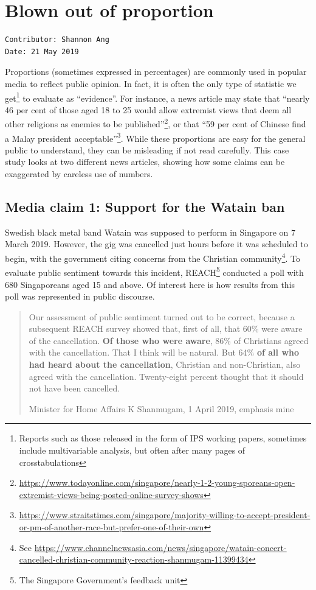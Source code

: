 \documentclass[openany]{book}
\let\rmarkdownfootnote\footnote%
\def\footnote{\protect\rmarkdownfootnote}
\begin{document}
\chapter{Blown out of proportion}\label{oop}

\begin{verbatim}
Contributor: Shannon Ang
Date: 21 May 2019
\end{verbatim}

Proportions (sometimes expressed in percentages) are commonly used in
popular media to reflect public opinion. In fact, it is often the only
type of statistic we get\footnote{Reports such as those released in the
  form of IPS working papers, sometimes include multivariable analysis,
  but often after many pages of crosstabulations} to evaluate as
``evidence''. For instance, a news article may state that ``nearly 46
per cent of those aged 18 to 25 would allow extremist views that deem
all other religions as enemies to be published''\footnote{\url{https://www.todayonline.com/singapore/nearly-1-2-young-sporeans-open-extremist-views-being-posted-online-survey-shows}},
or that ``59 per cent of Chinese find a Malay president
acceptable''\footnote{\url{https://www.straitstimes.com/singapore/majority-willing-to-accept-president-or-pm-of-another-race-but-prefer-one-of-their-own}}.
While these proportions are easy for the general public to understand,
they can be misleading if not read carefully. This case study looks at
two different news articles, showing how some claims can be exaggerated
by careless use of numbers.

\section{Media claim 1: Support for the Watain ban}\label{watain}

Swedish black metal band Watain was supposed to perform in Singapore on
7 March 2019. However, the gig was cancelled just hours before it was
scheduled to begin, with the government citing concerns from the
Christian community\footnote{See
  \url{https://www.channelnewsasia.com/news/singapore/watain-concert-cancelled-christian-community-reaction-shanmugam-11399434}}.
To evaluate public sentiment towards this incident, REACH\footnote{The
  Singapore Government's feedback unit} conducted a poll with 680
Singaporeans aged 15 and above. Of interest here is how results from
this poll was represented in public discourse.

\begin{quote}
Our assessment of public sentiment turned out to be correct, because a
subsequent REACH survey showed that, first of all, that 60\% were aware
of the cancellation. \textbf{Of those who were aware}, 86\% of
Christians agreed with the cancellation. That I think will be natural.
But 64\% \textbf{of all who had heard about the cancellation}, Christian
and non-Christian, also agreed with the cancellation. Twenty-eight
percent thought that it should not have been cancelled.

Minister for Home Affairs K Shanmugam, 1 April 2019, emphasis mine
\end{quote}
\end{document}
